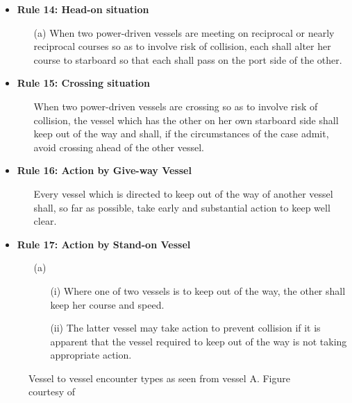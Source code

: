 \begin{itemize}
\begin{enumerate}
        \end{enumerate}
    \item \textbf{Rule 14: Head-on situation}
        \begin{enumerate}
            \item[(a)] When two power-driven vessels are meeting on reciprocal or nearly reciprocal courses so as to involve risk of collision, each shall alter her course to starboard so that each shall pass on the port side of the other.
        \end{enumerate}
    \item \textbf{Rule 15: Crossing situation}
    \begin{enumerate}
        \item[] When two power-driven vessels are crossing so as to involve risk of collision, the vessel which has the other on her own starboard side shall keep out of the way and shall, if the circumstances of the case admit, avoid crossing ahead of the other vessel.
    
    \end{enumerate}
    \item \textbf{Rule 16: Action by Give-way Vessel}
    \begin{enumerate}
        \item [] Every vessel which is directed to keep out of the way of another vessel shall, so far as possible, take early and substantial action to keep well clear.
    \end{enumerate}
    \item \textbf{Rule 17: Action by Stand-on Vessel}
    \begin{enumerate}
        \item[(a)]
        \begin{enumerate}
            \item[(i)] Where one of two vessels is to keep out of the way, the other shall keep her course and speed.
            \item[(ii)] The latter vessel may take action to prevent collision if it is apparent that the vessel required to keep out of the way is not taking appropriate action.
        \end{enumerate}
    \end{enumerate}
\end{itemize}


\begin{figure}
    \centering
    
    \caption{Vessel to vessel encounter types as seen from vessel A. Figure courtesy of \cite{Thyri2022-VO}}
\end{figure}

